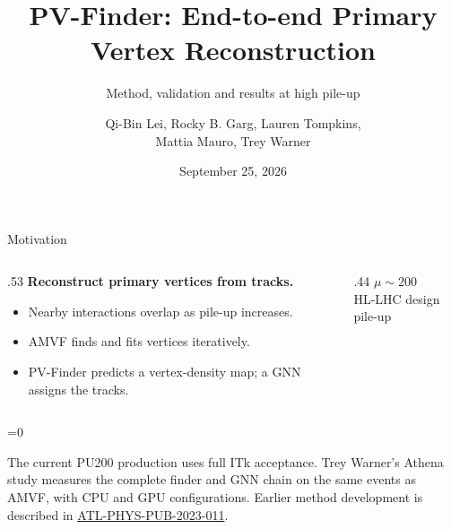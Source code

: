 \documentclass[xcolor=table,aspectratio=169]{beamer}
\title[PV-Finder]{PV-Finder: End-to-end Primary Vertex Reconstruction}
\subtitle{Method, validation and results at high pile-up}
\author[Mattia Mauro]{Qi-Bin Lei, Rocky B. Garg, Lauren Tompkins,\\\textcolor{pennred}{Mattia Mauro}, Trey Warner}
\institute[]{Stanford University}
\date{September 25, 2026}
\def\thisframelogos{}
\newcommand{\framelogo}[1]{\def\thisframelogos{#1}}
\providecommand{\talkbuild}{0}
\newcommand{\readingonly}[1]{\ifnum\talkbuild=0\relax#1\fi}
\newcommand{\readingnote}[1]{\readingonly{\par\vspace{.35em}%
  {\footnotesize\color{black!65}#1\par}}}
\newcommand{\bigvalue}[2]{{\LARGE\bfseries\textcolor{pennred}{#1}}\\[.4em]{\small #2}\par}
\newcommand{\pubnote}{\href{https://cds.cern.ch/record/2858348}{ATL-PHYS-PUB-2023-011}}
\begin{document}


\framelogo{}

\begin{frame}[plain]\titlepage\end{frame}

\begin{frame}{Motivation}
\relax
\begin{columns}[c]\begin{column}{.53\linewidth}
\textbf{Reconstruct primary vertices from tracks.}
\par\vspace{1em}
\begin{itemize}\setlength\itemsep{.7em}
\item Nearby interactions overlap as pile-up increases.
\item AMVF finds and fits vertices iteratively.
\item PV-Finder predicts a vertex-density map; a GNN assigns the tracks.
\end{itemize}
\end{column}\begin{column}{.44\linewidth}\centering
\bigvalue{$\mu\sim200$}{HL-LHC design pile-up}
\par\vspace{1.5em}
\end{column}\end{columns}\readingnote{The current PU200 production uses full ITk acceptance. Trey Warner's Athena study measures the complete finder and GNN chain on the same events as AMVF, with CPU and GPU configurations. Earlier method development is described in \pubnote.}
\end{frame}




\newcommand{\gnnEfficiency}{$68.68\pm0.06\%$}
\newcommand{\gnnPurity}{$69.45\pm0.06\%$}
\newcommand{\gnnAssigned}{$98.89\pm0.01\%$}
\newcommand{\gnnCleanReco}{$51.78\pm0.13\%$}
\newcommand{\amvfEfficiency}{$68.32\pm0.06\%$}
\newcommand{\amvfPurity}{$68.65\pm0.06\%$}
\newcommand{\amvfAssigned}{$99.52\pm0.01\%$}
\newcommand{\amvfCleanReco}{$35.17\pm0.10\%$}
\newcommand{\gnnGainEfficiency}{$+0.37\pm0.02$}
\newcommand{\gnnGainPurity}{$+0.80\pm0.02$}
\end{document}
